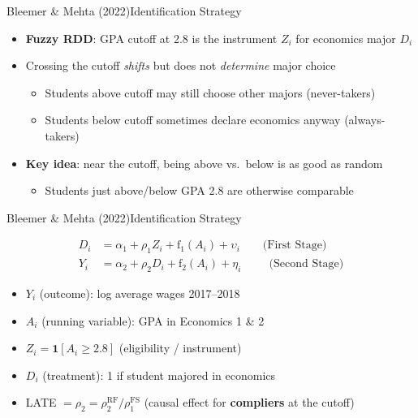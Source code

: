 \documentclass[dvipsnames,hyperref={pdfpagelabels=false}]{beamer}
\begin{document}
\begin{frame}{Bleemer \& Mehta (2022)}{Identification Strategy}
	\begin{itemize}
		\item \textbf{Fuzzy RDD}: GPA cutoff at 2.8 is the instrument $Z_i$ for economics major $D_i$
		\vspace{0.2cm}
		\item Crossing the cutoff \emph{shifts} but does not \emph{determine} major choice
		\begin{itemize}
			\vspace{0.2cm}
			\item Students above cutoff may still choose other majors (never-takers)
			\item Students below cutoff sometimes declare economics anyway (always-takers)
		\end{itemize}
		\vspace{0.2cm}
		\item \textbf{Key idea}: near the cutoff, being above vs.\ below is as good as random
		\begin{itemize}
			\vspace{0.2cm}
			\item Students just above/below GPA 2.8 are otherwise comparable
		\end{itemize}
	\end{itemize}
\end{frame}


\begin{frame}{Bleemer \& Mehta (2022)}{Identification Strategy}

	\begin{equation*}
	\begin{aligned}
	D_i &= \alpha_1 + \rho_1 Z_i + \mathrm{f}_1(A_i) + \upsilon_i \qquad \text{(First Stage)}\\
	Y_i &= \alpha_2 + \rho_2 D_i + \mathrm{f}_2(A_i) + \eta_i \qquad\;\, \text{(Second Stage)}
	\end{aligned}
	\end{equation*}

	\begin{itemize}
		\item $Y_i$ (outcome): log average wages 2017--2018
		\vspace{0.2cm}
		\item $A_i$ (running variable): GPA in Economics 1 \& 2
		\vspace{0.2cm}
		\item $Z_i = \mathbf{1}[A_i \geq 2.8]$ (eligibility / instrument)
		\vspace{0.2cm}
		\item $D_i$ (treatment): 1 if student majored in economics
		\vspace{0.2cm}
		\item LATE $= \rho_2 = \rho_2^{\text{RF}} / \rho_1^{\text{FS}}$
		(causal effect for \textbf{compliers} at the cutoff)
	\end{itemize}
\end{frame}
\end{document}
